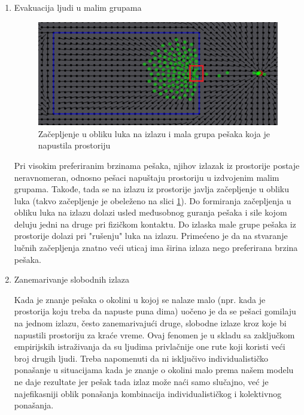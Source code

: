 \documentclass[12pt]{article}
\begin{document}
\begin{enumerate}
\item Evakuacija ljudi u malim grupama

\begin{figure}
\centering
\includegraphics{SCGrupa1}
\caption{Začepljenje u obliku luka na izlazu i mala grupa pešaka koja je napustila prostoriju}
\label{fig:grupa}
\end{figure}


Pri visokim preferiranim brzinama pešaka, njihov izlazak iz prostorije postaje neravnomeran, odnosno pešaci napuštaju prostoriju u izdvojenim malim grupama. Takođe, tada se na izlazu iz prostorije javlja začepljenje u obliku luka (takvo začepljenje je obeleženo na slici \ref{fig:grupa}). Do formiranja začepljenja u obliku luka na izlazu dolazi usled međusobnog guranja pešaka i sile kojom deluju jedni na druge pri fizičkom kontaktu. Do izlaska male grupe pešaka iz prostorije dolazi pri "rušenju" luka na izlazu. Primećeno je da na stvaranje lučnih začepljenja znatno veći uticaj ima širina izlaza nego preferirana brzina pešaka.

\item Zanemarivanje slobodnih izlaza

Kada je znanje pešaka o okolini u kojoj se nalaze malo (npr. kada je prostorija koju treba da napuste puna dima) uočeno je da se pešaci gomilaju na jednom izlazu, često zanemarivajući druge, slobodne izlaze kroz koje bi napustili prostoriju za kraće vreme. Ovaj fenomen je u skladu sa zaključkom empirijskih istraživanja da su ljudima privlačnije one rute koji koristi veći broj drugih ljudi. Treba napomenuti da ni isključivo individualističko ponašanje u situacijama kada je znanje o okolini malo prema našem modelu ne daje rezultate jer pešak tada izlaz može naći samo slučajno, već je najefikasniji oblik ponašanja kombinacija individualističkog i kolektivnog ponašanja.


\end{enumerate}
    
\end{document}
